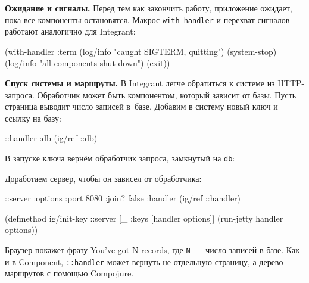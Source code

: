 
\textbf{Ожидание и сигналы.} Перед тем как закончить работу, приложение ожидает,
пока все компоненты остановятся. Макрос \verb|with-handler| и перехват
сигналов работают аналогично для Integrant:

\begin{english}
  \begin{clojure}
(with-handler :term
  (log/info "caught SIGTERM, quitting")
  (system-stop)
  (log/info "all components shut down")
  (exit))
  \end{clojure}
\end{english}


\textbf{Спуск системы и маршруты.} В Integrant легче обратиться к системе из
HTTP-запроса. Обработчик может быть компонентом, который зависит от базы. Пусть
страница выводит число записей в~базе. Добавим в систему новый ключ и ссылку на
базу:

\begin{english}
  \begin{clojure}
{::handler {:db (ig/ref ::db)}}
  \end{clojure}
\end{english}

\noindent
В запуске ключа вернём обработчик запроса, замкнутый на \verb|db|:

\begin{english}
\end{english}

\noindent
Доработаем сервер, чтобы он зависел от обработчика:

\begin{english}
  \begin{clojure}
{::server {:options {:port 8080 :join? false}
           :handler (ig/ref ::handler)}}

(defmethod ig/init-key ::server
  [_ {:keys [handler options]}]
  (run-jetty handler options))
  \end{clojure}
\end{english}

Браузер покажет фразу You've got N records, где \verb|N|~--- число записей
в базе. Как и в Component, \verb|::handler| может вернуть не отдельную
страницу, а дерево маршрутов с помощью Compojure.

